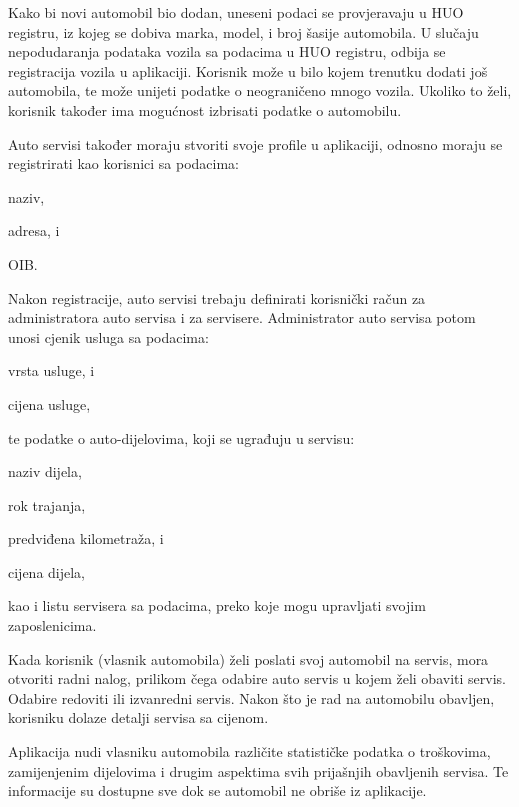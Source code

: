 		Kako bi novi automobil bio dodan, uneseni podaci  se provjeravaju u HUO registru, iz kojeg se dobiva marka, model, i broj šasije automobila. U slučaju nepodudaranja podataka  vozila sa podacima u HUO registru, odbija se registracija vozila u aplikaciji. Korisnik može u bilo kojem trenutku dodati još automobila, te  može unijeti podatke o  neograničeno mnogo vozila. Ukoliko to želi, korisnik također ima mogućnost  izbrisati podatke o automobilu. 
		
		Auto servisi također moraju stvoriti svoje profile u aplikaciji, odnosno moraju se registrirati kao korisnici sa podacima:
		\begin{packed_item}
			\item naziv,
			\item adresa, i
			\item OIB.
		\end{packed_item}
		 
		 Nakon registracije, auto servisi trebaju definirati  korisnički račun za administratora auto servisa i za servisere. Administrator auto servisa potom unosi cjenik usluga sa podacima:
		 \begin{packed_item}
		 	\item vrsta usluge, i
		 	\item cijena usluge,
		 \end{packed_item}
	 
	 	 te podatke o auto-dijelovima, koji se ugrađuju u servisu:
	 	 \begin{packed_item}
	 	 	\item naziv dijela,
	 	 	\item rok trajanja,
	 	 	\item predviđena kilometraža, i
	 	 	\item cijena dijela,
	 	 \end{packed_item}
		 
		 kao i listu servisera sa podacima, preko koje mogu upravljati svojim zaposlenicima. 
		
		Kada korisnik (vlasnik automobila) želi poslati svoj automobil na servis, mora otvoriti radni nalog, prilikom čega odabire auto servis u kojem želi obaviti servis. Odabire redoviti ili izvanredni servis. Nakon što je rad na automobilu obavljen, korisniku dolaze detalji servisa sa cijenom.  
		
		Aplikacija nudi vlasniku automobila različite statističke podatka o troškovima, zamijenjenim dijelovima i drugim aspektima svih prijašnjih obavljenih servisa. Te informacije su dostupne sve dok se automobil ne obriše iz aplikacije.
		
